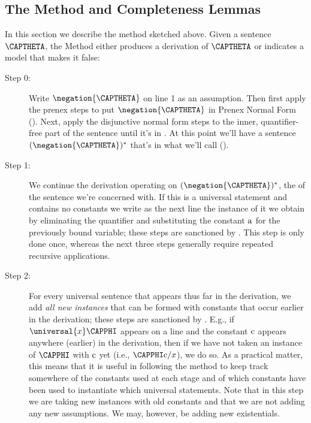 \subsection{The Method and Completeness Lemmas}\label{The Method Section}
In this section we describe the method sketched above. 
Given a sentence $\CAPTHETA$, the Method either produces a derivation of $\CAPTHETA$ or indicates a model that makes it false:

\begin{description}
\item[Step 0:] Write $\negation{\CAPTHETA}$ on line 1 as an assumption.
Then first apply the prenex steps to put $\negation{\CAPTHETA}$ in Prenex Normal Form (). 
Next, apply the disjunctive normal form steps to the inner, quantifier-free part of the sentence until it's in . 
At this point we'll have a sentence $(\negation{\CAPTHETA})^*$ that's in what we'll call  ().  

\item[Step 1:] We continue the derivation operating on $(\negation{\CAPTHETA})^*$, the  of the sentence we're concerned with. 
If this  is a universal statement and contains no constants we write as the next line the instance of it we obtain by eliminating the quantifier and substituting the constant $\mathrm{a}$ for the previously bound variable;
these steps are sanctioned by .
This step is only done once, whereas the next three steps generally require repeated recursive applications. 

\item[Step 2:] For every universal sentence that appears thus far in the derivation, we add \emph{all new instances} that can be formed with constants that occur earlier in the derivation;
these steps are sanctioned by .
E.g., if $\universal{\variable{x}}\CAPPHI$ appears on a line and the constant $\mathrm{c}$ appears anywhere (earlier) in the derivation, then if we have not taken an instance of $\CAPPHI$ with $\mathrm{c}$ yet (i.e., $\CAPPHI\constant{c}/\variable{x}$), we do so.
As a practical matter, this means that it is useful in following the method to keep track somewhere of the constants used at each stage and of which constants have been used to instantiate which universal statements.
Note that in this step we are taking new instances with old constants and that we are not adding any new assumptions. 
We may, however, be adding new existentials. 


\end{description}
